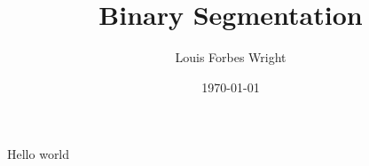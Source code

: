 \documentclass{article}
\title{Binary Segmentation}
\author{Louis Forbes Wright}
\date{\today}
\begin{document}
\maketitle

Hello world
\end{document}
